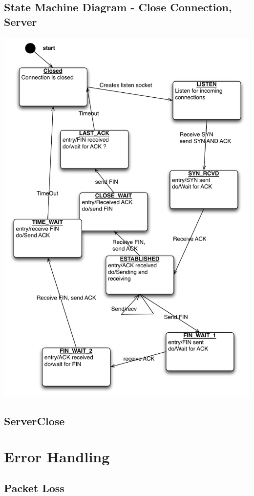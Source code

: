 \documentclass{article}
\begin{document}
\subsection{State Machine Diagram - Close Connection, Server}
\includegraphics[scale=0.95]{KtnStateConnectionCloseServer.pdf}


\subsection{ServerClose}

\section{Error Handling}

\subsection{Packet Loss}
\end{document}
